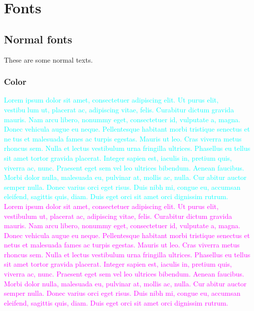 \documentclass{article}
\begin{document}
\section{Fonts}
\subsection{Normal fonts}
These are some normal texts.
\subsubsection{Color}
\textcolor{cyan}{Lorem ipsum dolor sit amet, consectetuer adipiscing elit. Ut purus elit, vestibulum ut, placerat ac, adipiscing vitae, felis. Curabitur dictum gravida mauris.
Nam arcu libero, nonummy eget, consectetuer id, vulputate a, magna. Donec
vehicula augue eu neque. Pellentesque habitant morbi tristique senectus et netus et malesuada fames ac turpis egestas. Mauris ut leo. Cras viverra metus
rhoncus sem. Nulla et lectus vestibulum urna fringilla ultrices. Phasellus eu
tellus sit amet tortor gravida placerat. Integer sapien est, iaculis in, pretium
quis, viverra ac, nunc. Praesent eget sem vel leo ultrices bibendum. Aenean
faucibus. Morbi dolor nulla, malesuada eu, pulvinar at, mollis ac, nulla. Curabitur auctor semper nulla. Donec varius orci eget risus. Duis nibh mi, congue
eu, accumsan eleifend, sagittis quis, diam. Duis eget orci sit amet orci dignissim
rutrum.}\\

\textcolor{magenta}{Lorem ipsum dolor sit amet, consectetuer adipiscing elit. Ut purus elit,
vestibulum ut, placerat ac, adipiscing vitae, felis. Curabitur dictum gravida
mauris. Nam arcu libero, nonummy eget, consectetuer id, vulputate a, magna.
Donec vehicula augue eu neque. Pellentesque habitant morbi tristique senectus
et netus et malesuada fames ac turpis egestas. Mauris ut leo. Cras viverra
metus rhoncus sem. Nulla et lectus vestibulum urna fringilla ultrices. Phasellus
eu tellus sit amet tortor gravida placerat. Integer sapien est, iaculis in, pretium
quis, viverra ac, nunc. Praesent eget sem vel leo ultrices bibendum. Aenean
faucibus. Morbi dolor nulla, malesuada eu, pulvinar at, mollis ac, nulla. Curabitur auctor semper nulla. Donec varius orci eget risus. Duis nibh mi, congue
eu, accumsan eleifend, sagittis quis, diam. Duis eget orci sit amet orci dignissim
rutrum.}\\
\end{document}
